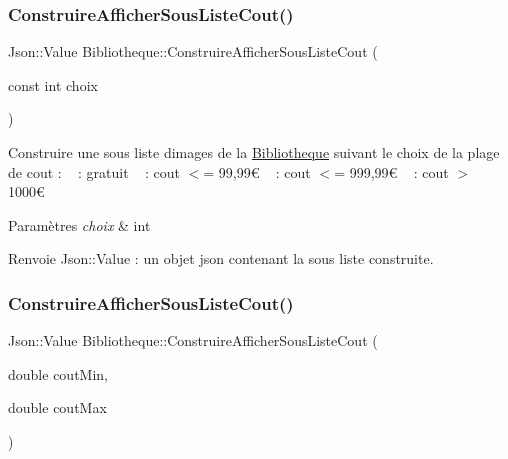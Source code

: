 \subsubsection{\texorpdfstring{Construire\+Afficher\+Sous\+Liste\+Cout()}{ConstruireAfficherSousListeCout()}\hspace{0.1cm}{\footnotesize\ttfamily [1/2]}}
{\footnotesize\ttfamily Json\+::\+Value Bibliotheque\+::\+Construire\+Afficher\+Sous\+Liste\+Cout (\begin{DoxyParamCaption}\item[{const int}]{choix }\end{DoxyParamCaption})}



Construire une sous liste d\textquotesingle{}images de la \hyperlink{classBibliotheque}{Bibliotheque} suivant le choix de la plage de cout \+: ~ \+: gratuit ~ \+: cout $<$= 99,99€ ~ \+: cout $<$= 999,99€ ~ \+: cout $>$ 1000€ 


\begin{DoxyParams}{Paramètres}
{\em choix} & int \\
\hline
\end{DoxyParams}
\begin{DoxyReturn}{Renvoie}
Json\+::\+Value \+: un objet json contenant la sous liste construite. 
\end{DoxyReturn}
\mbox{\label{classBibliotheque_a3b03f7002bdb3bf8292ab5a676f74bf0}} 
\subsubsection{\texorpdfstring{Construire\+Afficher\+Sous\+Liste\+Cout()}{ConstruireAfficherSousListeCout()}\hspace{0.1cm}{\footnotesize\ttfamily [2/2]}}
{\footnotesize\ttfamily Json\+::\+Value Bibliotheque\+::\+Construire\+Afficher\+Sous\+Liste\+Cout (\begin{DoxyParamCaption}\item[{double}]{cout\+Min,  }\item[{double}]{cout\+Max }\end{DoxyParamCaption})}



